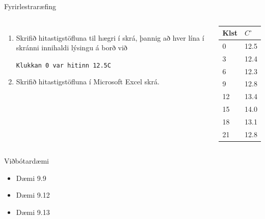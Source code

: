 \documentclass[handout]{beamer}
\begin{document}
\begin{frame}[fragile]{Fyrirlestraræfing}
    \begin{columns}
    \begin{enumerate}
         \item Skrifið hitastigstöfluna til hægri í skrá, þannig að hver lína í skránni innihaldi lýsingu á borð við

         \texttt{Klukkan 0 var hitinn 12.5C}
         \item Skrifið hitastigstöfluna í Microsoft Excel skrá.
    \end{enumerate}
    \begin{center}
    \begin{tabular}{ll}
    \toprule
    Klst&$C^\circ$\\
    \midrule
    0&12.5\\
    3&12.4\\
    6&12.3\\
    9&12.8\\
    12&13.4\\
    15&14.0\\
    18&13.1\\
    21&12.8\\
    \bottomrule
    \end{tabular}
    \end{center}
    \end{columns}
\end{frame}

\begin{frame}{Viðbótardæmi}
    \begin{itemize}
        \item Dæmi 9.9
        \item Dæmi 9.12
        \item Dæmi 9.13
    \end{itemize}
\end{frame}
\end{document}
